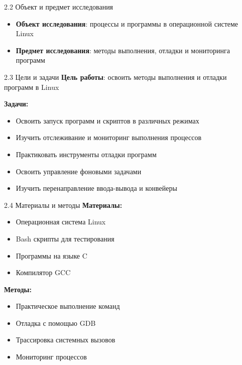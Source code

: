 \documentclass[
  ignorenonframetext,
  aspectratio=169,
  russian,
]{beamer}
\providecommand{\tightlist}{%
  \setlength{\itemsep}{0pt}\setlength{\parskip}{0pt}}
\begin{document}
\begin{frame}{2.2 Объект и предмет исследования}
\label{ux43eux431ux44aux435ux43aux442-ux438-ux43fux440ux435ux434ux43cux435ux442-ux438ux441ux441ux43bux435ux434ux43eux432ux430ux43dux438ux44f}
\begin{itemize}[<+->]
\tightlist
\item
  \textbf{Объект исследования}: процессы и программы в операционной
  системе Linux
\item
  \textbf{Предмет исследования}: методы выполнения, отладки и
  мониторинга программ
\end{itemize}
\end{frame}

\begin{frame}{2.3 Цели и задачи}
\label{ux446ux435ux43bux438-ux438-ux437ux430ux434ux430ux447ux438}
\textbf{Цель работы}: освоить методы выполнения и отладки программ в
Linux

\textbf{Задачи:}

\begin{itemize}[<+->]
\tightlist
\item
  Освоить запуск программ и скриптов в различных режимах
\item
  Изучить отслеживание и мониторинг выполнения процессов
\item
  Практиковать инструменты отладки программ
\item
  Освоить управление фоновыми задачами
\item
  Изучить перенаправление ввода-вывода и конвейеры
\end{itemize}
\end{frame}

\begin{frame}{2.4 Материалы и методы}
\label{ux43cux430ux442ux435ux440ux438ux430ux43bux44b-ux438-ux43cux435ux442ux43eux434ux44b}
\textbf{Материалы:}

\begin{itemize}[<+->]
\tightlist
\item
  Операционная система Linux
\item
  Bash скрипты для тестирования
\item
  Программы на языке C
\item
  Компилятор GCC
\end{itemize}

\textbf{Методы:}

\begin{itemize}[<+->]
\tightlist
\item
  Практическое выполнение команд
\item
  Отладка с помощью GDB
\item
  Трассировка системных вызовов
\item
  Мониторинг процессов
\end{itemize}
\end{frame}
\end{document}
